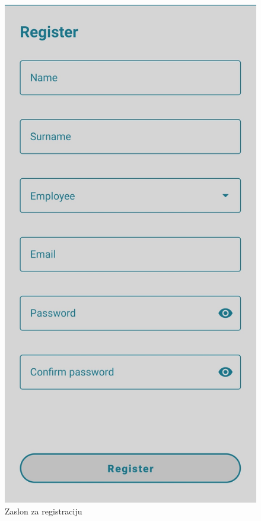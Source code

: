 			\begin{figure}[H]
				\includegraphics[scale=0.25]{slike/register.jpg}
				\caption{Zaslon za registraciju}
			\end{figure}
			
			\eject 
		
